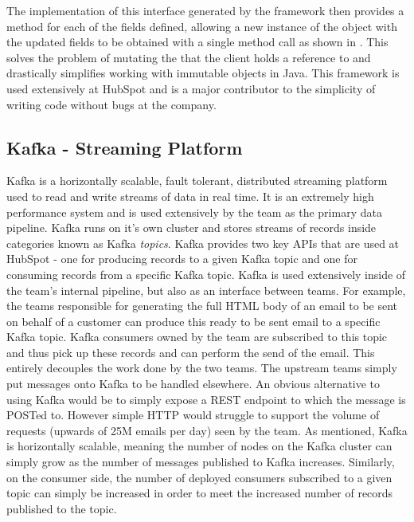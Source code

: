 

The implementation of this interface generated by the framework then provides a  method for each of the fields defined, allowing a new instance of the object with the updated fields to be obtained with a single method call as shown in . This solves the problem of mutating the  that the client holds a reference to and drastically simplifies working with immutable objects in Java. This framework is used extensively at HubSpot and is a major contributor to the simplicity of writing code without bugs at the company.




\subsection{Kafka - Streaming Platform}\label{sec:kafka}
Kafka \cite{kafka} is a horizontally scalable, fault tolerant, distributed streaming platform used to read and write streams of data in real time. It is an extremely high performance system and is used extensively by the \team{} team as the primary data pipeline. Kafka runs on it's own cluster and stores streams of records inside categories known as Kafka \textit{topics}. Kafka provides two key APIs that are used at HubSpot - one for producing records to a given Kafka topic and one for consuming records from a specific Kafka topic. Kafka is used extensively inside of the team's internal pipeline, but also as an interface between teams. For example, the teams responsible for generating the full HTML body of an email to be sent on behalf of a customer can produce this ready to be sent email to a specific Kafka topic. Kafka consumers owned by the \team{} team are subscribed to this topic and thus pick up these records and can perform the send of the email. This entirely decouples the work done by the two teams. The upstream teams simply put messages onto Kafka to be handled elsewhere. An obvious alternative to using Kafka would be to simply expose a REST endpoint to which the message is POSTed to. However simple HTTP would struggle to support the volume of requests (upwards of 25M emails per day) seen by the \team{} team. As mentioned, Kafka is horizontally scalable, meaning the number of nodes on the Kafka cluster can simply grow as the number of messages published to Kafka increases. Similarly, on the consumer side, the number of deployed consumers subscribed to a given topic can simply be increased in order to meet the increased number of records published to the topic.

